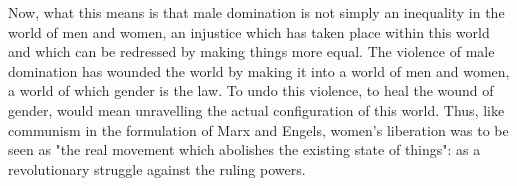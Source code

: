 \documentclass[ebook]{memoir}
\begin{document}
Now, what this means is that male domination is not simply an inequality in the world of men and women, an injustice which has taken place within this world and which can be redressed by making things more equal. The violence of male domination has wounded the world by making it into a world of men and women, a world of which gender is the law. To undo this violence, to heal the wound of gender, would mean unravelling the actual configuration of this world. Thus, like communism in the formulation of Marx and Engels, women's liberation was to be seen as "the real movement which abolishes the existing state of things": as a revolutionary struggle against the ruling powers.
\end{document}
